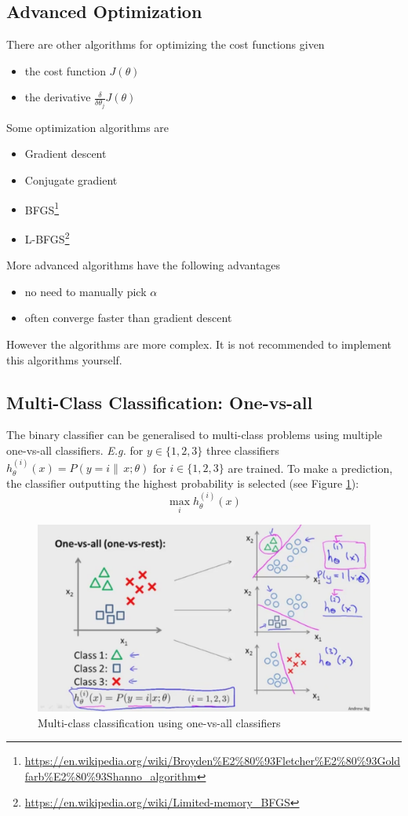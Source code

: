 \documentclass[a4paper,twoside,10pt]{article}
\begin{document}
\subsection{Advanced Optimization}
There are other algorithms for optimizing the cost functions given
\begin{itemize}
  \item the cost function $J(\theta)$
  \item the derivative $\frac{\delta}{\delta\theta_j}J(\theta)$
\end{itemize}
Some optimization algorithms are
\begin{itemize}
  \item Gradient descent
  \item Conjugate gradient
  \item \acs{BFGS}\footnote{\url{https://en.wikipedia.org/wiki/Broyden\%E2\%80\%93Fletcher\%E2\%80\%93Goldfarb\%E2\%80\%93Shanno_algorithm}}
  \item \acs{L-BFGS}\footnote{\url{https://en.wikipedia.org/wiki/Limited-memory_BFGS}}
\end{itemize}
More advanced algorithms have the following advantages
\begin{itemize}
  \item no need to manually pick $\alpha$
  \item often converge faster than gradient descent
\end{itemize}
However the algorithms are more complex. It is not recommended to implement this algorithms yourself.

\subsection{Multi-Class Classification: One-vs-all}\label{cha:onevsall}
The binary classifier can be generalised to multi-class problems using multiple one-vs-all classifiers.
\emph{E.g.} for $y\in\{1,2,3\}$ three classifiers $h_\theta^{(i)}(x)=P(y=i\|\,x;\theta)$ for $i\in\{1,2,3\}$ are trained.
To make a prediction, the classifier outputting the highest probability is selected (see Figure \ref{fig:onevsall}):
\begin{equation*}
  \mathop{\operatorname{max}}_ih_\theta^{(i)}(x)
\end{equation*}
\begin{figure}[htbp]
  \begin{center}
    \includegraphics[width=.6\textwidth]{onevsall}
    \caption{Multi-class classification using one-vs-all classifiers\citep{andrewng}\label{fig:onevsall}}
  \end{center}
\end{figure}
\end{document}
